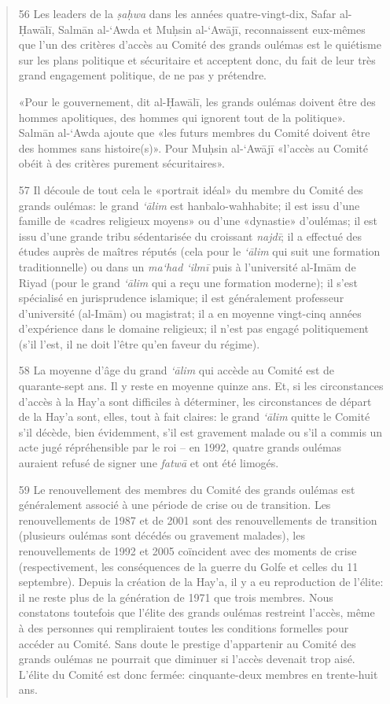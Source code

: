 \begin{quote}
56 Les leaders de la \emph{ṣaḥwa} dans les années quatre-vingt-dix,
Safar al-Ḥawālī, Salmān al-`Awda et Muḥsin al-`Awājī, reconnaissent
eux-mêmes que l'un des critères d'accès au Comité des grands oulémas est
le quiétisme sur les plans politique et sécuritaire et acceptent donc,
du fait de leur très grand engagement politique, de ne pas y prétendre.

«Pour le gouvernement, dit al-Ḥawālī, les grands oulémas doivent être
des hommes apolitiques, des hommes qui ignorent tout de la politique».
Salmān al-`Awda ajoute que
«les futurs membres du Comité doivent être des hommes sans histoire(s)».
Pour Muḥsin al-`Awājī «l'accès au Comité obéit à des critères purement
sécuritaires».

57 Il découle de tout cela le «portrait idéal» du membre du Comité des
grands oulémas:
le grand \emph{`ālim} est hanbalo-wahhabite; il est issu d'une famille
de «cadres religieux moyens» ou d'une «dynastie» d'oulémas; il est issu
d'une grande tribu sédentarisée du croissant \emph{najdī}; il a effectué
des études auprès de maîtres réputés (cela pour le \emph{`ālim} qui suit
une formation traditionnelle) ou dans un \emph{ma`had `ilmī} puis à
l'université al-Imām de Riyad (pour le grand \emph{`ālim} qui a reçu une
formation moderne); il s'est spécialisé en jurisprudence islamique; il
est généralement professeur d'université (al-Imām) ou magistrat; il a en
moyenne vingt-cinq années d'expérience dans le domaine religieux; il
n'est pas engagé politiquement (s'il l'est, il ne doit l'être qu'en
faveur du régime).

58 La moyenne d'âge du grand \emph{`ālim} qui accède au Comité est de
quarante-sept ans. Il y reste en moyenne quinze ans. Et, si les
circonstances d'accès à la Hay'a sont difficiles à déterminer, les
circonstances de départ de la Hay'a sont, elles, tout à fait claires: le
grand \emph{`ālim} quitte le Comité s'il décède, bien évidemment, s'il
est gravement malade ou s'il a commis un acte jugé répréhensible par le
roi -- en 1992, quatre grands oulémas auraient refusé de signer une
\emph{fatwā} et ont été limogés.

59 Le renouvellement des membres du Comité des grands oulémas est
généralement associé à une période de crise ou de transition. Les
renouvellements de 1987 et de 2001 sont des renouvellements de
transition (plusieurs oulémas sont décédés ou gravement malades), les
renouvellements de 1992 et 2005 coïncident avec des moments de crise
(respectivement, les conséquences de la guerre du Golfe et celles du 11
septembre). Depuis la création de la Hay'a, il y a eu reproduction de
l'élite: il ne reste plus de la génération de 1971 que trois membres.
Nous constatons toutefois que l'élite des grands oulémas restreint
l'accès, même à des personnes qui rempliraient toutes les conditions
formelles pour accéder au Comité. Sans doute le prestige d'appartenir au
Comité des grands oulémas ne pourrait que diminuer si l'accès devenait
trop aisé. L'élite du Comité est donc fermée: cinquante-deux membres en
trente-huit ans.
\end{quote}

